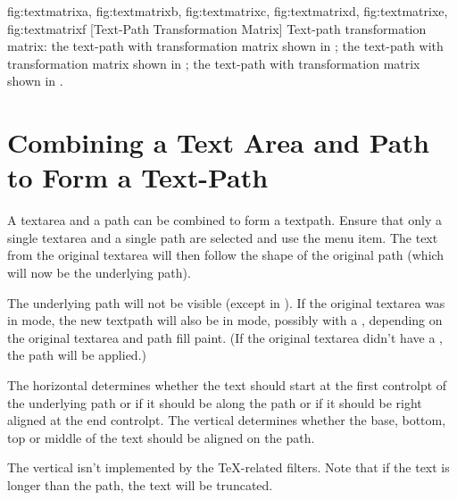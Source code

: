 {
  {fig:textmatrixa}{}{},
  {fig:textmatrixb}{}{},
  {fig:textmatrixc}{}{},
  {fig:textmatrixd}{}{},
  {fig:textmatrixe}{}{},
  {fig:textmatrixf}{}{}
}
[Text-Path Transformation Matrix]
{Text-path transformation matrix:
 the text-path with transformation matrix shown in
;
 the text-path with transformation matrix shown
in ;
 the text-path with transformation matrix
shown in .}

\section{Combining a Text Area and Path to Form a Text-Path}\label{sec:textpath}


A \gls{textarea} and a \gls{path} can be combined to form a
\gls{textpath}. Ensure that only a single \gls{textarea} and a
single \gls{path} are selected and use the 
menu item. The text from the original \gls{textarea} will then follow
the shape of the original path (which will now be the underlying
path).

The underlying path will not be visible (except in \editpathmode).
If the original \gls*{textarea} was in  mode, the new
\gls*{textpath} will also be in  mode, possibly with a 
, depending on the original \gls*{textarea} and \gls*{path}
fill paint. (If the original \gls*{textarea} didn't have a
, the \gls*{path}  will be applied.)

The horizontal  determines
whether the text should start at the first \gls{controlpt} of the
underlying path or if it should be  along the path or if
it should be right aligned at the end \gls*{controlpt}. The vertical
 determines whether the base, bottom, top or middle of the
text should be aligned on the path. 

\begin{important}
The vertical  isn't implemented by the
 \TeX-related filters. Note that if the text is
longer than the path, the text will be truncated.
\end{important}

